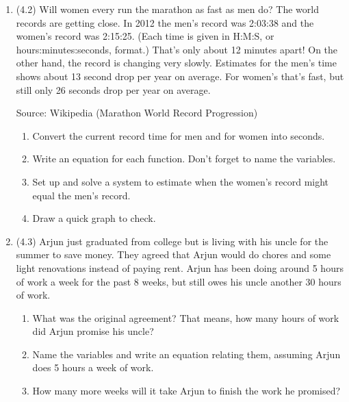 \documentclass[12pt]{article}
\begin{document}
\begin{enumerate}
\item (4.2)  Will women every run the marathon as fast as men do?  The world records are getting close.  In 2012 the men's record was 2:03:38 and the women's record was 2:15:25.  (Each time is given in H:M:S, or hours:minutes:seconds, format.)  That's only about 12 minutes apart!  On the other hand, the record is changing very slowly.  Estimates for the men's time shows about 13 second drop per year on average.  For women's that's fast, but still only 26 seconds drop per year on average.

\hfill \begin{footnotesize} Source:  Wikipedia (Marathon World Record Progression) \end{footnotesize}
\begin{enumerate}
\item Convert the current record time for men and for women into seconds.
\item Write an equation for each function.  Don't forget to name the variables.
\item Set up and solve a system to estimate when the women's record might equal the men's record.
\item Draw a quick graph to check.
\end{enumerate}

\item  (4.3) Arjun just graduated from college but is living with his uncle for the summer to save money.  They agreed that Arjun would do chores and some light renovations instead of paying rent.  Arjun has been doing around 5 hours of work a week for the past 8 weeks, but still owes his uncle another 30 hours of work.
\begin{enumerate}
\item What was the original agreement? That means, how many hours of work did Arjun promise his uncle?
\item Name the variables and write an equation relating them, assuming Arjun does 5 hours a week of work.
\item How many more weeks will it take Arjun to finish the work he promised? 
\end{enumerate}


\end{enumerate}
\end{document}
